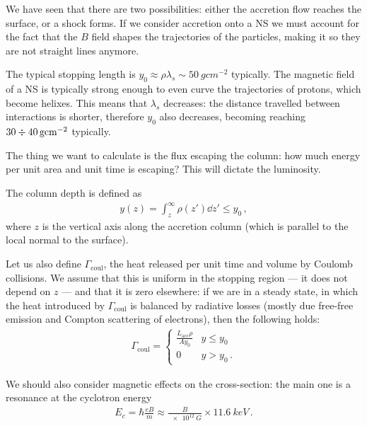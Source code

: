 \documentclass[main.tex]{subfiles}
\begin{document}

We have seen that there are two possibilities: either the accretion flow reaches the surface, or a shock forms.
If we consider accretion onto a NS we must account for the fact that the \(B\) field shapes the trajectories of the particles, making it so they are not straight lines anymore. 

The typical stopping length is \(y_0 \approx \rho \lambda _s \sim \SI{50}{g cm^{-2}}\) typically. 
The magnetic field of a NS is typically strong enough to even curve the trajectories of protons, which become helixes. This means that \(\lambda _s\) decreases: the distance travelled between interactions is shorter, therefore \(y_0\) also decreases, becoming reaching \(30 \divisionsymbol \SI{40}{g cm^{-2}}\) typically. 

The thing we want to calculate is the flux escaping the column: how much energy per unit area and unit time is escaping? This will dictate the luminosity. 

The column depth is defined as 
%
\begin{align}
y(z) = \int_{z}^{\infty } \rho (z' ) \dd{z'} \leq y_0 
\,,
\end{align}
%
where \(z\) is the vertical axis along the accretion column (which is parallel to the local normal to the surface). 

Let us also define \(\Gamma _{\text{coul}}\), the heat released per unit time and volume by Coulomb collisions. We assume that this is uniform in the stopping region --- it does not depend on \(z\) --- and that it is zero elsewhere: if we are in a steady state, in which the heat introduced by \(\Gamma _{\text{coul}}\) is balanced by radiative losses (mostly due free-free emission and Compton scattering of electrons), then the following holds:
%
\begin{align}
\Gamma _{\text{coul}} = \begin{cases}
    \frac{L _{\text{acc}} \rho }{A y_0 } & y \leq y_0   \\
    0 & y > y_0 
\,.
\end{cases}
\end{align}

We should also consider magnetic effects on the cross-section: the main one is a resonance at the cyclotron energy 
%
\begin{align}
E_c = \hbar \frac{e B}{m} \approx \frac{B}{\SI{e12}{G}} \times \SI{11.6}{keV}
\,.
\end{align}
\end{document}
